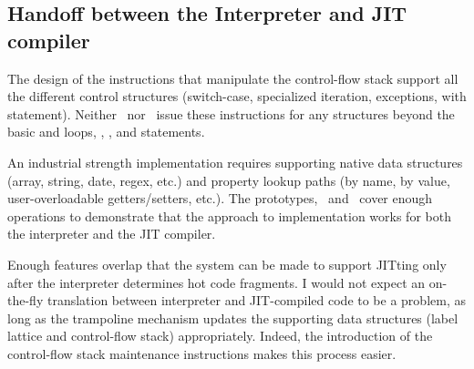 \subsection{Handoff between the Interpreter and JIT compiler}

The design of the instructions that manipulate the control-flow stack support all the different control structures (switch-case, specialized iteration, exceptions, with statement).
Neither \FlowCore\ nor \JitFlow\ issue these instructions for any structures beyond the basic  and  loops, , , and  statements.

An industrial strength implementation requires supporting native data structures (array, string, date, regex, etc.) and property lookup paths (by name, by value, user-overloadable getters/setters, etc.).
The prototypes, \FlowCore\ and \JitFlow\ cover enough operations to demonstrate that the approach to implementation works for both the interpreter and the JIT compiler.

Enough features overlap that the system can be made to support JITting only after the interpreter determines hot code fragments.
I would not expect an on-the-fly translation between interpreter and JIT-compiled code to be a problem, as long as the trampoline mechanism updates the supporting data structures (label lattice and control-flow stack) appropriately.
Indeed, the introduction of the control-flow stack maintenance instructions makes this process easier.

